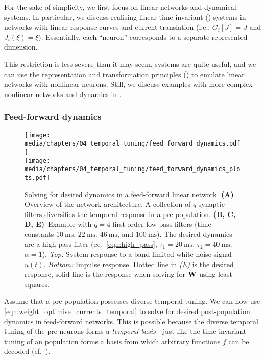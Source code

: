 For the sake of simplicity, we first focus on linear networks and dynamical systems.
In particular, we discuss realising linear time-invariant (\LTI) systems in networks with linear response curves and current-translation (i.e., $G_i[J] = J$ and $J_i(\xi) = \xi$).
Essentially, each \enquote{neuron} corresponds to a separate represented dimension.

This restriction is less severe than it may seem.
\LTI systems are quite useful, and we can use the \NEF representation and transformation principles () to emulate linear networks with nonlinear neurons.
Still, we discuss examples with more complex nonlinear networks and dynamics in .

\subsubsection{Feed-forward dynamics}

\begin{figure}
	\centering
	\texttt{[image: media/chapters/04\_temporal\_tuning/feed\_forward\_dynamics.pdf]}\\[-0.875em]
	\texttt{[image: media/chapters/04\_temporal\_tuning/feed\_forward\_dynamics\_plots.pdf]}
	\caption[Solving for desired dynamics in a feed-forward linear network]{Solving for desired dynamics in a feed-forward linear network.
	\textbf{(A)} Overview of the network architecture. 
	A collection of $q$ synaptic filters diversifies the temporal response in a pre-population.
	\textbf{(B, C, D, E)}~Example with $q = 4$ first-order low-pass filters (time-constants $\SI{10}{\milli\second}$, $\SI{22}{\milli\second}$, $\SI{46}{\milli\second}$, and $\SI{100}{\milli\second}$).
	The desired dynamics are a high-pass filter (eq.~\ref{eqn:high_pass}, $\tau_1 = \SI{20}{\milli\second}$, $\tau_2 = \SI{40}{\milli\second}$, $\alpha = 1$).
	\emph{Top:} System response to a band-limited white noise signal $u(t)$.
	\emph{Bottom:} Impulse response.
	Dotted line in \emph{(E)} is the desired response, solid line is the response when solving for $\mathbf{W}$ using least-squares.
	}
	\label{fig:feed_forward_dynamics}
\end{figure}

Assume that a pre-population possesses diverse temporal tuning.
We can now use \cref{eqn:weight_optimise_currents_temporal} to solve for desired post-population dynamics in feed-forward networks.
This is possible because the diverse temporal tuning of the pre-neurons forms a \emph{temporal basis}---just like the time-invariant tuning of an \NEF population forms a basis from which arbitrary functions $f$ can be decoded (cf.~).

